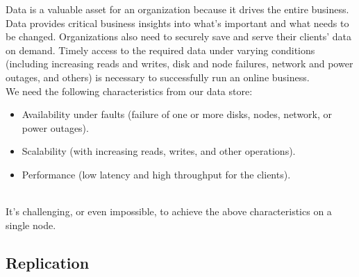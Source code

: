 

Data is a valuable asset for an organization because it drives the entire business.
\\
Data provides critical business insights into what's important and what needs to be changed. Organizations also need to securely save and serve their clients' data on demand. Timely access to the required data under varying conditions (including increasing reads and writes, disk and node failures, network and power outages, and others) is necessary to successfully run an online business.
\\
We need the following characteristics from our data store:

\begin{itemize}
\item
\protect{}\label{riSSwQqPf5Gab0sbmHKzN}
Availability under faults (failure of one or more disks, nodes, network, or power outages).
\item
\protect{}\label{VsmW85br7UM5doZ6aAocv}
Scalability (with increasing reads, writes, and other operations).
\item
\protect{}\label{zuM-RoCRLz1x35D-neerU}
Performance (low latency and high throughput for the clients).
\end{itemize}
\\
It's challenging, or even impossible, to achieve the above characteristics on a single node.

\subsection{Replication}\label{C_jDLaBiATQCKHvgJeaj4}

